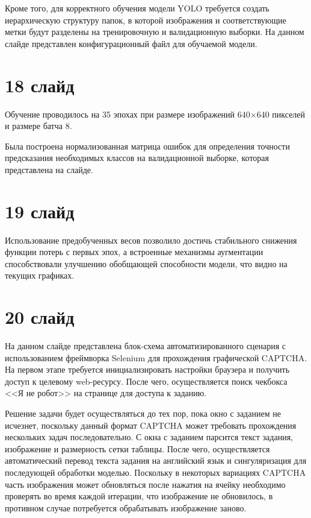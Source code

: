 \documentclass{altsu-report}
\begin{document}
Кроме того, для корректного обучения модели YOLO требуется создать иерархическую 
структуру папок, в которой изображения и соответствующие метки будут разделены на 
тренировочную и валидационную выборки. На данном слайде представлен 
конфигурационный файл для обучаемой модели.

\section*{18 слайд}

Обучение проводилось на 35 эпохах при размере изображений 640×640 пикселей и 
размере батча 8.

Была построена нормализованная матрица ошибок для определения точности 
предсказания необходимых классов на валидационной выборке, которая представлена 
на слайде.

\section*{19 слайд}

Использование предобученных весов позволило достичь стабильного снижения функции 
потерь с первых эпох, а встроенные механизмы аугментации способствовали улучшению 
обобщающей способности модели, что видно на текущих графиках.

\section*{20 слайд}

На данном слайде представлена блок-схема автоматизированного сценария с 
использованием фреймворка Selenium для прохождения графической CAPTCHA. 
На первом этапе требуется инициализировать настройки браузера и получить доступ 
к целевому web-ресурсу. После чего, осуществляется поиск чекбокса <<Я не робот>> 
на странице для доступа к заданию.

Решение задачи будет осуществляться до тех пор, пока окно с заданием не исчезнет, 
поскольку данный формат CAPTCHA может требовать прохождения нескольких задач 
последовательно. С окна с заданием парсится текст задания, изображение и 
размерность сетки таблицы. После чего, осуществляется автоматический перевод 
текста задания на английский язык и сингуляризация для последующей обработки 
моделью. Поскольку в некоторых вариациях CAPTCHA часть изображения может 
обновляться после нажатия на ячейку необходимо проверять во время каждой 
итерации, что изображение не обновилось, в противном случае потребуется 
обрабатывать изображение заново.
\end{document}
